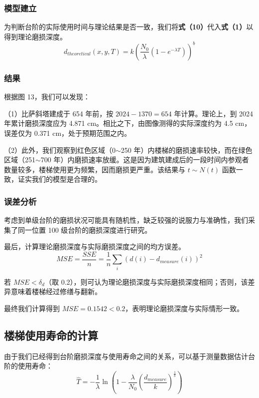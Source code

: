 \documentclass[11pt,a4paper]{ctexart}
\begin{document}
\subsubsection{模型建立}

为判断台阶的实际使用时间与理论结果是否一致，我们将\textbf{式（10）}代入\textbf{式（1）}以得到理论磨损深度。
\begin{equation}
d_{theoretical}(x,y,T)=k\left(\frac{N_0}{\lambda}\left(1-e^{-\lambda T}\right)\right)^b\tag{11}
\end{equation}

\subsubsection{结果}

根据图 13，我们可以发现：

（1）比萨斜塔建成于 654 年前，按 $2024-1370=654$ 年计算。理论上，到 2024 年累计磨损深度应为 4.871 cm。相比之下，由图像测得的实际深度约为 4.5 cm，误差仅为 0.371 cm，处于预期范围之内。

（2）此外，我们观察到红色区域（0$\sim$250 年）内楼梯的磨损速率较快，而在绿色区域（251$\sim$700 年）内磨损速率放缓。这是因为建筑建成后的一段时间内参观者数量较多，楼梯使用更为频繁，因而磨损更严重。该结果与 $t\sim N(t)$ 函数一致，证实我们的模型是合理的。

\subsubsection{误差分析}

考虑到单级台阶的磨损状况可能具有随机性，缺乏较强的说服力与准确性，我们采集了同一位置 100 级台阶的磨损深度进行研究。

最后，计算理论磨损深度与实际磨损深度之间的均方误差。
\begin{equation}
MSE=\frac{SSE}{n}=\frac{1}{n}\sum_i\left(d(i)-d_{measure}(i)\right)^2\tag{12}
\end{equation}

若 $MSE<\delta_d$（取 0.2），则可认为理论磨损深度与实际磨损深度相同；否则，该差异意味着楼梯经过修缮与翻新。

最终我们计算得到 $MSE=0.1542<0.2$，表明理论磨损深度与实际情形一致。

\subsection{楼梯使用寿命的计算}

由于我们已经得到台阶磨损深度与使用寿命之间的关系，可以基于测量数据估计台阶的使用寿命：
\begin{equation}
\hat T=-\frac{1}{\lambda}\ln\left(1-\frac{\lambda}{N_0}\left(\frac{d_{measure}}{k}\right)^{\frac{1}{b}}\right)\tag{13}
\end{equation}
\end{document}
